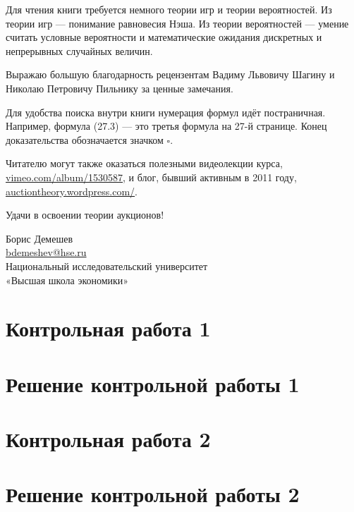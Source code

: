 \documentclass[11pt, openany]{book}
\numberwithin{equation}{page} %
\theoremstyle{definition} %
\theoremstyle{definition}
\theoremstyle{definition}
\begin{document}
Для чтения книги требуется немного теории игр и теории вероятностей. Из теории игр — понимание равновесия Нэша. Из теории вероятностей — умение считать условные вероятности и математические ожидания дискретных и непрерывных случайных величин.

Выражаю большую благодарность рецензентам Вадиму Львовичу Шагину и Николаю Петровичу Пильнику за ценные замечания.

Для удобства поиска внутри книги нумерация формул идёт постраничная. Например, формула (27.3) — это третья формула на 27-й странице. Конец доказательства обозначается значком $\square$.

Читателю могут также оказаться полезными видеолекции курса, \url{vimeo.com/album/1530587}, и блог, бывший активным в 2011 году, \url{auctiontheory.wordpress.com/}.

Удачи в освоении теории аукционов!

\begin{flushright}
  Борис Демешев \\
  \href{mailto:bdemeshev@hse.ru}{bdemeshev@hse.ru} \\
  Национальный исследовательский университет\\
  «Высшая школа экономики»
\end{flushright}




\section{Контрольная работа 1}



\section{Решение контрольной работы 1}






\section{Контрольная работа 2}



\section{Решение контрольной работы 2}
\end{document}
